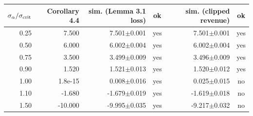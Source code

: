 \begin{tabular}{rrrcrc}
\toprule
$\sigma_\alpha/\sigma_{\rm crit}$ & Corollary 4.4 & sim. (Lemma 3.1 loss) & ok & sim. (clipped revenue) & ok \\
\midrule
0.25 & 7.500 & 7.501$\pm$0.001 & yes & 7.501$\pm$0.001 & yes \\
0.50 & 6.000 & 6.002$\pm$0.004 & yes & 6.002$\pm$0.004 & yes \\
0.75 & 3.500 & 3.499$\pm$0.009 & yes & 3.496$\pm$0.009 & yes \\
0.90 & 1.520 & 1.521$\pm$0.013 & yes & 1.520$\pm$0.012 & yes \\
1.00 & 1.8e-15 & 0.008$\pm$0.016 & yes & 0.025$\pm$0.015 & no \\
1.10 & -1.680 & -1.679$\pm$0.019 & yes & -1.619$\pm$0.018 & no \\
1.50 & -10.000 & -9.995$\pm$0.035 & yes & -9.217$\pm$0.032 & no \\
\bottomrule
\end{tabular}
